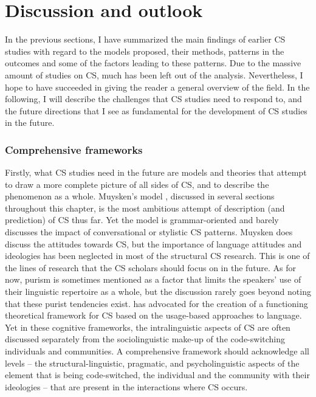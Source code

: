 \documentclass[output=paper,
modfonts
]{langscibook}
\begin{document}
\section{Discussion and outlook}
In the previous sections, I have summarized the main findings of earlier CS studies with regard to the models proposed, their methods, patterns in the outcomes and some of the factors leading to these patterns. Due to the massive amount of studies on CS, much has been left out of the analysis. Nevertheless, I hope to have succeeded in giving the reader a general overview of the field.  In the following, I will describe the challenges that CS studies need to respond to, and the future directions that I see as fundamental for the development of CS studies in the future.

\subsubsection*{Comprehensive frameworks} \label{subsubsec-comprehensive}
Firstly, what CS studies need in the future are models and theories that attempt to draw a more complete picture of all sides of CS, and to describe the phenomenon as a whole. Muysken’s model \parencite{muysken2000,muysken2013language}, discussed in several sections throughout this chapter, is the most ambitious attempt of description (and prediction) of CS thus far. Yet the model is grammar-oriented and barely discusses the impact of conversational or stylistic CS patterns. Muysken does discuss the attitudes towards CS, but the importance of language attitudes and ideologies has been neglected in most of the structural CS research. This is one of the lines of research that the CS scholars should focus on in the future. As for now, purism is sometimes mentioned as a factor that limits the speakers’ use of their linguistic repertoire as a whole, but the discussion rarely goes beyond noting that these purist tendencies exist. \cite{backus2013usage, backus2015usage} has advocated for the creation of a functioning theoretical framework for CS based on the usage-based approaches to language. Yet in these cognitive frameworks, the intralinguistic aspects of CS are often discussed separately from the sociolinguistic make-up of the code-switching individuals and communities. A comprehensive framework should acknowledge all levels – the structural-linguistic, pragmatic, and psycholinguistic aspects of the element that is being code-switched, the individual and the community with their ideologies – that are present in the interactions where CS occurs.
\end{document}
